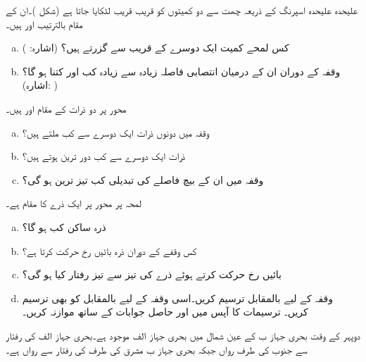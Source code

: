 علیحدہ علیحدہ اسپرنگ کے ذریعہ چھت سے دو کمیتوں کو قریب قریب لٹکایا جاتا ہے (شکل )۔ان کے مقام بالترتیب  اور  ہیں۔
\begin{enumerate}[a.]
\item
کس لمحے  کمیت ایک دوسرے کے قریب سے گزرتے ہیں؟ (اشارہ: )
\item
وقفہ  کے دوران ان کے درمیان انتصابی فاصلہ زیادہ سے زیادہ کب اور کتنا ہو گا؟ \\(اشارہ: ) 
\end{enumerate} 
محور   پر دو ذرات کے مقام  اور  ہیں۔
\begin{enumerate}[a.]
\item
وقفہ  میں دونوں ذرات ایک دوسرے سے کب ملتے ہیں؟
\item
ذرات ایک دوسرے سے کب دور ترین ہوتے ہیں؟
\item
وقفہ  میں ان کے بیچ فاصلے  کی تبدیلی  کب تیز ترین ہو گی؟
\end{enumerate}
لمحہ  پر محور  پر ایک ذرے کا مقام  ہے۔
\begin{enumerate}[a.]
\item
ذرہ ساکن کب ہو گا؟
\item
کس وقفے کے دوران ذرہ بائیں رخ حرکت کرتا ہے؟
\item
بائیں رخ حرکت کرتے ہوئے ذرے کی تیز سے تیز رفتار کیا ہو گی؟
\item
وقفہ  کے لیے  بالمقابل  ترسیم کریں۔اسی وقفہ کے لیے  بالمقابل  کو بھی ترسیم کریں۔ ترسیمات کا  آپس میں اور حاصل جوابات کے ساتھ موازنہ کریں۔
\end{enumerate}
دوپہر کے وقت   بحری جہاز ب کے عین شمال میں بحری جہاز الف موجود ہے۔بحری جہاز الف  کی رفتار سے جنوب کی طرف رواں جبکہ بحری جہاز ب مشرق کی طرف  کی رفتار سے رواں ہے۔
